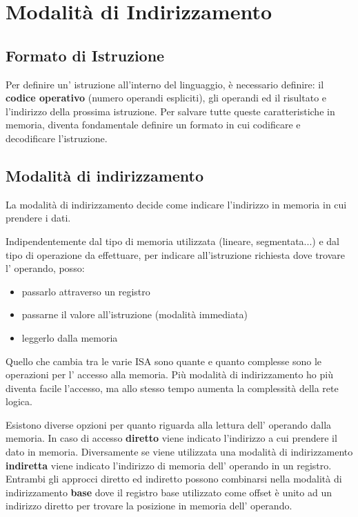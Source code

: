 \documentclass[../ace.tex]{subfiles}
\begin{document}
\section{Modalità di Indirizzamento}
\subsection{Formato di Istruzione}
Per definire un' istruzione all'interno del linguaggio, è necessario definire:
il \textbf{codice operativo} (numero operandi espliciti), gli operandi ed il risultato
e l'indirizzo della prossima istruzione.
Per salvare tutte queste caratteristiche in memoria, diventa fondamentale definire
un formato in cui codificare e decodificare l'istruzione.

\subsection{Modalità di indirizzamento}
La modalità di indirizzamento decide come indicare l'indirizzo in memoria in
cui prendere i dati.

Indipendentemente dal tipo di memoria utilizzata (lineare, segmentata...) e dal tipo di
operazione da effettuare, per indicare all'istruzione richiesta dove trovare l' operando,
posso:
\begin{itemize}
    \item passarlo attraverso un registro
    \item passarne il valore all'istruzione (modalità immediata)
    \item leggerlo dalla memoria
\end{itemize}

Quello che cambia tra le varie ISA sono quante e quanto complesse sono le operazioni per
l' accesso alla memoria.
Più modalità di indirizzamento ho più diventa facile l'accesso, ma allo stesso tempo aumenta
la complessità della rete logica.

Esistono diverse opzioni per quanto riguarda alla lettura dell' operando dalla memoria.
In caso di accesso \textbf{diretto} viene indicato l'indirizzo a cui prendere il dato in memoria.
Diversamente se viene utilizzata una modalità di indirizzamento \textbf{indiretta} viene indicato
l'indirizzo di memoria dell' operando in un registro.
\\
Entrambi gli approcci diretto ed indiretto possono combinarsi nella modalità di indirizzamento
\textbf{base} dove il registro base utilizzato come offset è unito ad un indirizzo diretto per trovare
la posizione in memoria dell' operando.
\end{document}
